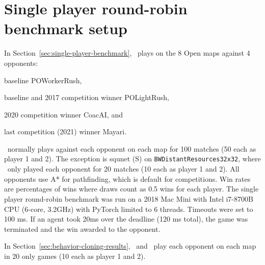\documentclass{article}
\begin{document}
\section{Single player round-robin benchmark setup}
\label{appendix:single-player-benchmark-setup}
In Section~\ref{sec:single-player-benchmark}, \agentName\ plays on the 8 Open maps
against 4 opponents:
\begin{inparaenum}[(1)]
    \item baseline POWorkerRush,
    \item baseline and 2017 competition winner POLightRush,
    \item 2020 competition winner CoacAI, and
    \item last competition (2021) winner Mayari.
\end{inparaenum}
\agentName\ normally plays against each opponent on each map for 100 matches (50
each as player 1 and 2). The exception is squnet (S) on \texttt{BWDistantResources32x32},
where \agentName\ only played each opponent for 20 matches (10 each as player 1 and 2).
All opponents use A* for pathfinding, which is default for competitions.  Win rates are 
percentages of wins where draws count as 0.5 wins for each player. The single player 
round-robin benchmark was run on a 2018 Mac Mini with Intel i7-8700B CPU (6-core, 
3.2GHz) with PyTorch limited to 6 threads. Timeouts were set to 100 ms. If
an agent took 20ms over the deadline (120 ms total), the game was terminated and the win
awarded to the opponent.

In Section~\ref{sec:behavior-cloning-results}, \bcAgent\ and \bcPPOAgent\ play each opponent on each map in 20 only games
(10 each as player 1 and 2).
\end{document}
